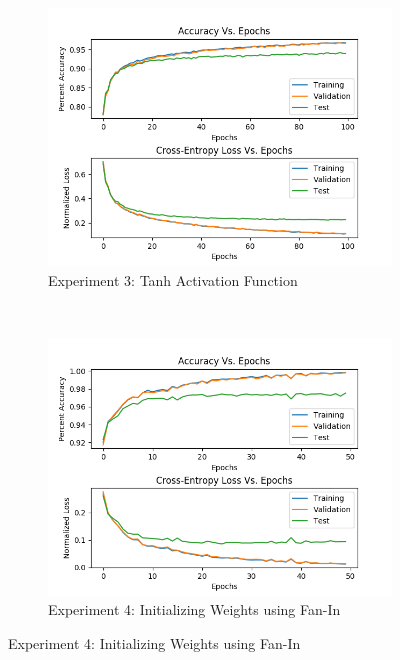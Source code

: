 \documentclass{article} %
\begin{document}
{{\begin{figure}[h!]
\captionsetup[subfigure]{labelformat=empty}
    \centering
    \begin{subfigure}[t]{0.5\textwidth}
        \centering
        \includegraphics[scale=0.48]{4B.png}
        \caption{Experiment 3: Tanh Activation Function}
    \end{subfigure}%
    ~ 
    \begin{subfigure}[t]{0.5\textwidth}
        \centering
        \includegraphics[scale=0.48]{4C.png}
        \caption{Experiment 4: Initializing Weights using Fan-In}
    \end{subfigure}
\end{figure}

}}
\end{document}
